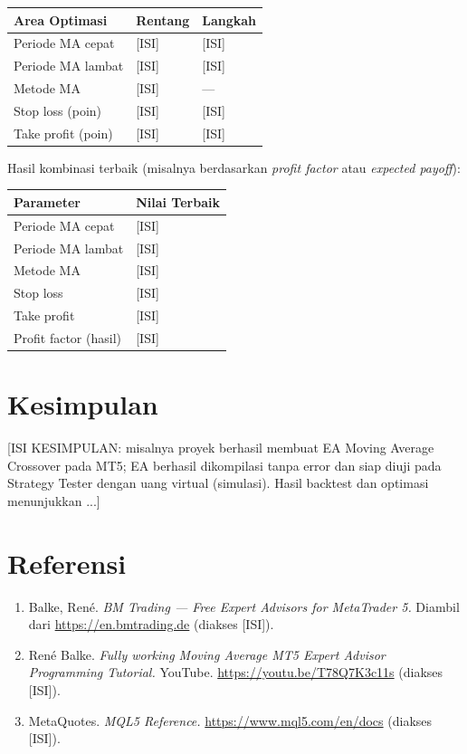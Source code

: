 \documentclass[12pt,a4paper]{article}
\begin{document}
\begin{longtable}{@{}p{}p{}p{}@{}}
\toprule
\textbf{Area Optimasi} & \textbf{Rentang} & \textbf{Langkah} \\
\midrule
Periode MA cepat & [ISI] & [ISI] \\
Periode MA lambat & [ISI] & [ISI] \\
Metode MA & [ISI] & --- \\
Stop loss (poin) & [ISI] & [ISI] \\
Take profit (poin) & [ISI] & [ISI] \\
\bottomrule
\end{longtable}

Hasil kombinasi terbaik (misalnya berdasarkan \textit{profit factor} atau
\textit{expected payoff}):

\begin{longtable}{@{}p{}p{}@{}}
\toprule
\textbf{Parameter} & \textbf{Nilai Terbaik} \\
\midrule
Periode MA cepat & [ISI] \\
Periode MA lambat & [ISI] \\
Metode MA & [ISI] \\
Stop loss & [ISI] \\
Take profit & [ISI] \\
Profit factor (hasil) & [ISI] \\
\bottomrule
\end{longtable}

\section{Kesimpulan}
[ISI KESIMPULAN: misalnya proyek berhasil membuat EA Moving Average Crossover pada MT5;
EA berhasil dikompilasi tanpa error dan siap diuji pada Strategy Tester dengan uang
virtual (simulasi). Hasil backtest dan optimasi menunjukkan ...]

\section{Referensi}
\begin{enumerate}
\item Balke, Ren\'e. \textit{BM Trading --- Free Expert Advisors for MetaTrader 5.}
      Diambil dari \url{https://en.bmtrading.de} (diakses [ISI]).
\item Ren\'e Balke. \textit{Fully working Moving Average MT5 Expert Advisor Programming
      Tutorial.} YouTube. \url{https://youtu.be/T78Q7K3c11s} (diakses [ISI]).
\item MetaQuotes. \textit{MQL5 Reference.} \url{https://www.mql5.com/en/docs}
      (diakses [ISI]).
\end{enumerate}
\end{document}

